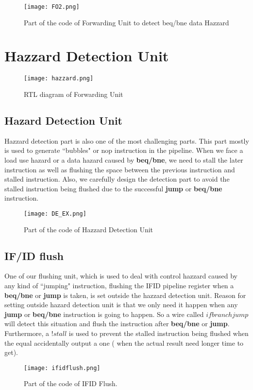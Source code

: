 \documentclass{article}[12pt]
\begin{document}
		
		
		\begin{figure}[H]
			\centering
			\texttt{[image: FO2.png]}
			\caption{Part of the code of Forwarding Unit to detect beq/bne data Hazzard}
		\end{figure}
			
	\section{Hazzard Detection Unit}
		\begin{figure}[H]
			\centering
			\texttt{[image: hazzard.png]}
			\caption{RTL diagram of Forwarding Unit}
		\end{figure}
	\subsection{Hazard Detection Unit}
	Hazzard detection part is also one of the most challenging parts. This part mostly is used to generate ``bubbles" or nop instruction in the pipeline. When we face a load use hazard or a data hazard caused by \textbf{beq/bne}, we need to stall the later instruction as well as flushing the space between the previous instruction and stalled instruction. Also, we carefully design the detection part to avoid the stalled instruction being flushed due to the successful \textbf{jump} or \textbf{beq/bne} instruction.
	\begin{figure}[H]
		\centering
		\texttt{[image: DE\_EX.png]}
		\caption{Part of the code of Hazzard Detection Unit}
	\end{figure}
	\subsection{IF/ID flush}
	One of our flushing unit, which is used to deal with control hazzard caused by any kind of ``jumping" instruction, flushing the IFID pipeline register when a \textbf{beq/bne} or \textbf{jump} is taken, is set outside the hazzard detection unit. Reason for setting outside hazard detection unit is that we only need it happen when any \textbf{jump} or \textbf{beq/bne} instruction is going to happen. So a wire called $ifbranchjump$ will detect this situation and flush the instruction after \textbf{beq/bne} or \textbf{jump}. Furthermore, a $!stall$ is used to prevent the stalled instruction being flushed when the equal accidentally output a one ( when the actual result need longer time to get).
	\begin{figure}[H]
		\centering
		\texttt{[image: ifidflush.png]}
		\caption{Part of the code of IFID Flush.}
	\end{figure}
	
\end{document}
